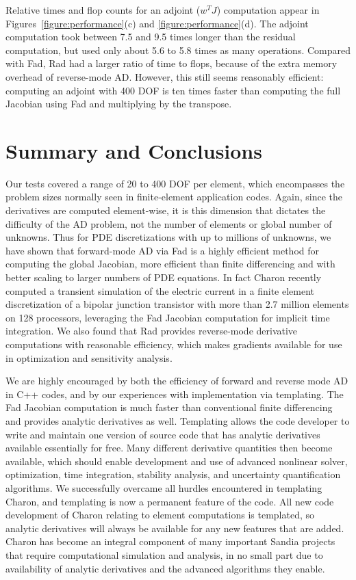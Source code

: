 \documentclass{llncs}
\begin{document}
Relative times and flop counts for an adjoint ($w^T J$) computation appear in
Figures~\ref{figure:performance}(c) and \ref{figure:performance}(d).  The adjoint computation took
between 7.5 and 9.5 times longer than the residual computation, but
used only about 5.6 to 5.8 times as many operations.  Compared with Fad,
Rad had a larger ratio
of time to flops, because of the extra memory overhead of reverse-mode AD.
However, this still seems reasonably
efficient:  computing an adjoint with 400
DOF is ten times faster than computing the full Jacobian using
Fad and multiplying by the transpose.

\section{Summary and Conclusions}
\label{sect:summary}

Our tests covered a range of 20 to 400 DOF per element,
which encompasses the problem
sizes normally seen in finite-element application codes.  Again, since the derivatives
are computed element-wise, it is this dimension that dictates the
difficulty of the AD problem, not the number of elements or global
number of unknowns.  Thus for PDE discretizations with up to millions
of unknowns, we have shown that forward-mode AD via Fad is a highly
efficient method for computing the global Jacobian, more
efficient than finite differencing and with better scaling to larger
numbers of PDE equations.  In fact Charon recently computed a
transient simulation of the electric current in a finite element
discretization of a bipolar junction transistor with
more than 2.7 million elements on 128 processors, leveraging the Fad
Jacobian computation for implicit time integration.
We also found that Rad provides
reverse-mode derivative computations with reasonable efficiency,
which makes gradients available for use in optimization and sensitivity analysis.

We are highly encouraged by both the efficiency of forward and reverse
mode AD in C++ codes, and by our experiences with implementation via
templating.  The Fad Jacobian computation is much faster
than conventional finite differencing and provides analytic derivatives as
well.  Templating allows the code developer to write and maintain one
version of source code that has analytic derivatives available
essentially for free.  Many different derivative
quantities then become available, which should enable development and use of advanced
nonlinear solver, optimization, time integration, stability analysis,
and uncertainty quantification algorithms.  We successfully
overcame all hurdles encountered in templating Charon,
and templating is now a permanent feature of the code.  All new code
development of Charon relating to element computations is templated,
so analytic derivatives will always be available for any new features
that are added.  Charon has become an integral component of many
important Sandia projects that require computational simulation and
analysis, in no small part due to availability of analytic derivatives
and the advanced algorithms they enable.



\end{document}
